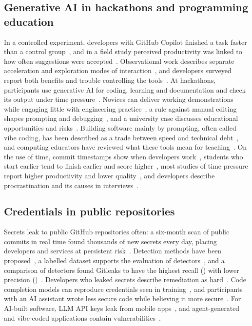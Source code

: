 \documentclass{article}
\begin{document}
\subsection{Generative AI in hackathons and programming education}
In a controlled experiment, developers with GitHub Copilot finished a task faster than a control group~\cite{peng2023copilot}, and in a field study perceived productivity was linked to how often suggestions were accepted~\cite{ziegler2024copilot}. Observational work describes separate acceleration and exploration modes of interaction~\cite{barke2023grounded}, and developers surveyed report both benefits and trouble controlling the tools~\cite{liang2024usability}. At hackathons, participants use generative AI for coding, learning and documentation and check its output under time pressure~\cite{zhou2026quickbuild}. Novices can deliver working demonstrations while engaging little with engineering practice~\cite{gama2025vibes}, a rule against manual editing shapes prompting and debugging~\cite{chen2026codeforall}, and a university case discusses educational opportunities and risks~\cite{sajja2024genaihack}. Building software mainly by prompting, often called vibe coding, has been described as a trade between speed and technical debt~\cite{waseem2025vibepractice}, and computing educators have reviewed what these tools mean for teaching~\cite{prather2023robots,denny2024computinged}. On the use of time, commit timestamps show when developers work~\cite{claes2018night}, students who start earlier tend to finish earlier and score higher~\cite{edwards2009behaviors,kazerouni2017procrastination}, most studies of time pressure report higher productivity and lower quality~\cite{kuutila2020timepressure}, and developers describe procrastination and its causes in interviews~\cite{saghi2025procrastination}.

\subsection{Credentials in public repositories}
Secrets leak to public GitHub repositories often: a six-month scan of public commits in real time found thousands of new secrets every day, placing developers and services at persistent risk~\cite{meli2019git}. Detection methods have been proposed~\cite{sinha2015secretkeys}, a labelled dataset supports the evaluation of detectors~\cite{basak2023secretbench}, and a comparison of detectors found Gitleaks to have the highest recall (\gitleaksrecall) with lower precision (\gitleaksprecision)~\cite{basak2023tools}. Developers who leaked secrets describe remediation as hard~\cite{krause2022pushed}. Code completion models can reproduce credentials seen in training~\cite{huang2024codesecret}, and participants with an AI assistant wrote less secure code while believing it more secure~\cite{perry2023insecure}. For AI-built software, LLM API keys leak from mobile apps~\cite{gao2026mindyourkey}, and agent-generated and vibe-coded applications contain vulnerabilities~\cite{zhao2025vibesafe,deng2026vibeinsecurity}.
\end{document}
